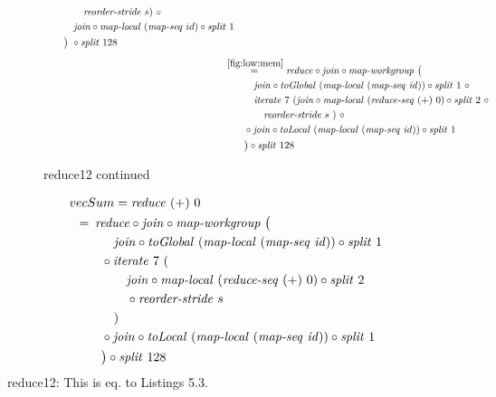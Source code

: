 \begin{figure*}[t]
\begin{align*}
\begin{aligned}
    &\qquad\qquad \reorderStride\ s)\ \circ\\
    &\qquad\quad\join \circ \mapLocal\ (\mapSeq\ id) \circ \splitN\ 1\\
    &\qquad\big)\ \circ \splitN\ 128
  \end{aligned}\\[.5em]
%
  &\hspace{-2em}\quad\begin{aligned}
    &\overset{\ref{fig:low:mem}}{=\hspace{.2em}}
      \reduce \circ \join \circ \mapWorkgroup\ \big(\\
    &\qquad\quad \join \circ \toGlobal\ (\mapLocal\ (\mapSeq\ \id)) \circ \splitN\ 1\ \circ\\
    &\qquad\quad \iterateN\ 7\ (\join \circ \mapLocal\ (\reduceSeq\ (+)\ 0) \circ \splitN\ 2\ \circ\\
    &\qquad\qquad \reorderStride\ s\ )\ \circ\\
    &\qquad \circ \join \circ \toLocal\ (\mapLocal\ (\mapSeq\ \id)) \circ \splitN\ 1\\
    &\qquad\big) \circ \splitN\ 128
  \end{aligned}
%  
\end{align*}
\caption{reduce12 continued}
\end{figure*}





\begin{align}
  &\hspace{-1.5em}vecSum = \reduce\ (+)\ 0\nonumber\\
  &\hspace{-2em}\quad\begin{aligned}
    &=\hspace{.2em}
      \reduce \circ \join \circ \mapWorkgroup\ \big(\\
      &\qquad\quad \join \circ \toGlobal\ (\mapLocal\ (\mapSeq\ \id)) \circ \splitN\ 1\\
      &\qquad \circ \iterateN\ 7\ (\\
      &\qquad\qquad \join \circ \mapLocal\ (\reduceSeq\ (+)\ 0) \circ \splitN\ 2\\
      &\qquad\qquad \circ \reorderStride\ s\\
      &\qquad\quad)\\
      &\qquad \circ \join \circ \toLocal\ (\mapLocal\ (\mapSeq\ \id)) \circ \splitN\ 1\\
      &\qquad\big) \circ \splitN\ 128
  \end{aligned}
\end{align}
reduce12: This is eq. to Listings 5.3.












